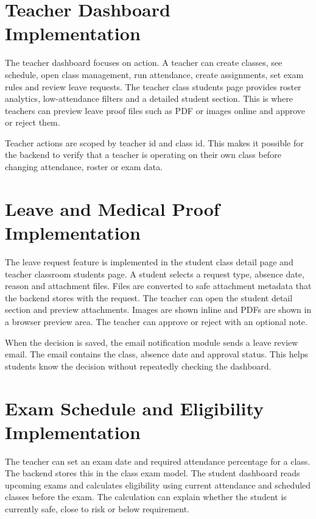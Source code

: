 \section{Teacher Dashboard Implementation}

The teacher dashboard focuses on action. A teacher can create classes, see schedule, open class management, run attendance, create assignments, set exam rules and review leave requests. The teacher class students page provides roster analytics, low-attendance filters and a detailed student section. This is where teachers can preview leave proof files such as PDF or images online and approve or reject them.

Teacher actions are scoped by teacher id and class id. This makes it possible for the backend to verify that a teacher is operating on their own class before changing attendance, roster or exam data.

\section{Leave and Medical Proof Implementation}

The leave request feature is implemented in the student class detail page and teacher classroom students page. A student selects a request type, absence date, reason and attachment files. Files are converted to safe attachment metadata that the backend stores with the request. The teacher can open the student detail section and preview attachments. Images are shown inline and PDFs are shown in a browser preview area. The teacher can approve or reject with an optional note.

When the decision is saved, the email notification module sends a leave review email. The email contains the class, absence date and approval status. This helps students know the decision without repeatedly checking the dashboard.

\section{Exam Schedule and Eligibility Implementation}

The teacher can set an exam date and required attendance percentage for a class. The backend stores this in the class exam model. The student dashboard reads upcoming exams and calculates eligibility using current attendance and scheduled classes before the exam. The calculation can explain whether the student is currently safe, close to risk or below requirement.


